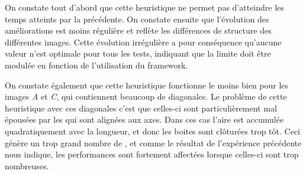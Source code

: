 				On constate tout d'abord que cette heuristique ne permet pas d'atteindre les temps atteints par la précédente. On constate
				ensuite que l'évolution des améliorations est moins régulière et reflète les différences de structure des différentes images. 
				Cette évolution irrégulière a pour conséquence qu'aucune valeur n'est optimale pour tous les tests, indiquant que la limite doit
				être modulée en fonction de l'utilisation du framework. 

				On constate également que cette heuristique fonctionne le moins bien pour les images \emph{A} et \emph{C}, qui contiennent
				beaucoup de diagonales.  Le problème de cette heuristique avec ces diagonales c'est que celles-ci sont particulièrement mal
				épousées par les \BB qui sont alignées aux axes. Dans ces cas l'aire est accumulée quadratiquement avec la longueur, et donc
				les boites sont clôturées trop tôt. Ceci génère un trop grand nombre de \BO, et comme le résultat de l'expérience précédente
				nous indique, les performances sont fortement affectées lorsque celles-ci sont trop nombreuses.

